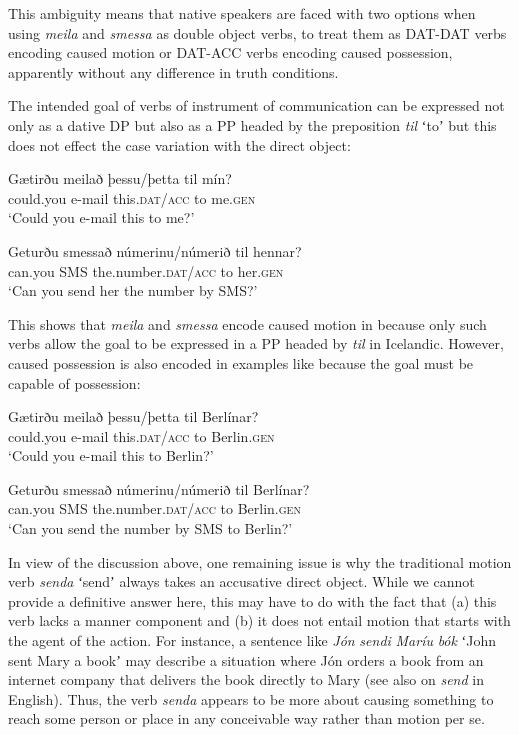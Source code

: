 \documentclass[output=paper,modfonts,nonflat,colorlinks,citecolor=brown]{langsci/langscibook}
\begin{document}
This ambiguity means that native speakers are faced with two options when using \textit{meila} and \textit{smessa} as double object verbs, to treat them as DAT-DAT verbs encoding caused motion or DAT-ACC verbs encoding caused possession, apparently without any difference in truth conditions.

The intended goal of verbs of instrument of communication can be expressed not only as a dative DP but also as a PP headed by the preposition \textit{til} ʻtoʼ \citep[128--132]{Barðdal2008} but this does not effect the case variation with the direct object:


\ea%
    \label{ex:jonsson:12}
\ea
\gll  Gætirðu  meilað  þessu/þetta  til  mín?\\
   could.you  e-mail  this.\textsc{dat/acc}  to  me.\textsc{gen}\\
\glt `Could you e-mail this to me?'

\ex
\gll   Geturðu  smessað  númerinu/númerið  til  hennar?\\
 can.you  SMS  the.number.\textsc{dat/acc}  to  her.\textsc{gen}\\
\glt `Can you send her the number by SMS?'
\z
\z

This shows that \textit{meila} and \textit{smessa} encode caused motion in  because only such verbs allow the goal to be expressed in a PP headed by \textit{til} in Icelandic. However, caused possession is also encoded in examples like  because the goal must be capable of possession:


\ea%
    \label{ex:jonsson:13}
\ea
\gll  *Gætirðu  meilað  þessu/þetta  til  Berlínar?\\
   could.you  e-mail  this.\textsc{dat/acc}  to  Berlin.\textsc{gen}\\
\glt `Could you e-mail this to Berlin?'

\ex
\gll   *Geturðu  smessað  númerinu/númerið  til  Berlínar?\\
 can.you  SMS  the.number.\textsc{dat/acc}  to  Berlin.\textsc{gen}\\
\glt `Can you send the number by SMS to Berlin?'
\z
\z

In view of the discussion above, one remaining issue is why the traditional motion verb \textit{senda} ʻsendʼ always takes an accusative direct object. While we cannot provide a definitive answer here, this may have to do with the fact that (a) this verb lacks a manner component and (b) it does not entail motion that starts with the agent of the action. For instance, a sentence like \textit{Jón} \textit{sendi} \textit{Maríu} \textit{bók} ʻJohn sent Mary a bookʼ may describe a situation where Jón orders a book from an internet company that delivers the book directly to Mary (see also \citealt{Beavers2011} on \textit{send} in English). Thus, the verb \textit{senda} appears to be more about causing something to reach some person or place in any conceivable way rather than motion per se.
\end{document}
